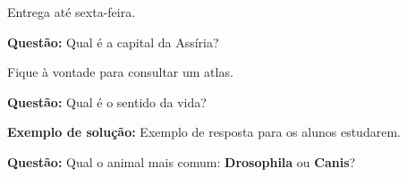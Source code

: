 \documentclass[12pt]{memoir}
\newcommand{\especie}[1]{\textbf{#1}}
\newenvironment{questao}{\par\textbf{Questão:}}{\par}
\newenvironment{resposta}{\par\textbf{Exemplo de solução:}}{\par}
\begin{document}
Entrega até sexta-feira.
\begin{questao}
Qual é a capital da Assíria?
\end{questao}

Fique à vontade para consultar um atlas.

\begin{questao}
Qual é o sentido da vida?
\end{questao}

\begin{resposta}
Exemplo de resposta para os alunos estudarem.
\end{resposta}

\begin{questao}
Qual o animal mais comum:
\especie{Drosophila} ou \especie{Canis}?
\end{questao}
\end{document}
